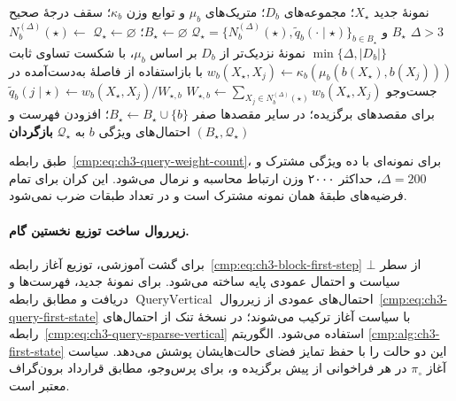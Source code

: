 \begin{algorithm}[!htbp]
\caption{زیرروال $\operatorname{QueryVertical}$: انتقال عمودی نمونهٔ جدید}
\label{cmp:alg:ch3-query-vertical}
\begin{algorithmic}[1]
\REQUIRE نمونهٔ جدید $X_\star$؛ مجموعه‌های $D_b$؛
متریک‌های $\mu_b$ و توابع وزن $\kappa_b$؛
سقف درجهٔ صحیح $\Delta>3$
\ENSURE $B_\star$ و
$\mathcal Q_\star=\{N_b^{(\Delta)}(\star),
\widetilde q_b(\cdot\mid\star)\}_{b\in B_\star}$
\STATE $B_\star\gets\varnothing$؛
$\mathcal Q_\star\gets\varnothing$
    \STATE $N_b^{(\Delta)}(\star)\gets$
    $\min\{\Delta,|D_b|\}$ نمونهٔ نزدیک‌تر
    از $D_b$ بر اساس $\mu_b$، با شکست تساوی ثابت
        \STATE $w_b(X_\star,X_j)\gets
        \kappa_b(\mu_b(b(X_\star),b(X_j)))$
        با بازاستفاده از فاصلهٔ به‌دست‌آمده در جست‌وجو
    \ENDFOR
    \STATE $W_{\star,b}\gets
    \sum_{X_j\in N_b^{(\Delta)}(\star)}w_b(X_\star,X_j)$
        \STATE $\widetilde q_b(j\mid\star)\gets
        w_b(X_\star,X_j)/W_{\star,b}$
        برای مقصدهای برگزیده؛ در سایر مقصدها صفر
        \STATE $B_\star\gets B_\star\cup\{b\}$؛
        افزودن فهرست و احتمال‌های ویژگی $b$ به $\mathcal Q_\star$
    \ENDIF
\ENDFOR
\STATE \textbf{بازگردان} $(B_\star,\mathcal Q_\star)$
\end{algorithmic}
\end{algorithm}

طبق رابطه~\eqref{cmp:eq:ch3-query-weight-count}،
برای نمونه‌ای با ده ویژگی مشترک و $\Delta=200$،
حداکثر ۲۰۰۰ وزن ارتباط محاسبه و نرمال می‌شود.
این کران برای تمام فرضیه‌های طبقهٔ همان نمونه
مشترک است و در تعداد طبقات ضرب نمی‌شود.

\paragraph{زیرروال ساخت توزیع نخستین گام.}
برای گشت آموزشی، توزیع آغاز
رابطه~\eqref{cmp:eq:ch3-block-first-step}
از سطر $\bot$ سیاست و احتمال
عمودی پایه ساخته می‌شود. برای
نمونهٔ جدید، فهرست‌ها و احتمال‌های عمودی
از زیرروال $\operatorname{QueryVertical}$
دریافت و مطابق
رابطه~\eqref{cmp:eq:ch3-query-first-state}
با سیاست آغاز ترکیب می‌شوند؛ در نسخهٔ تنک
از احتمال‌های رابطه~\eqref{cmp:eq:ch3-query-sparse-vertical}
استفاده می‌شود. الگوریتم
\ref{cmp:alg:ch3-first-state}
این دو حالت را با حفظ تمایز
فضای حالت‌هایشان پوشش می‌دهد.
سیاست آغاز $\pi_\circ$ در هر
فراخوانی از پیش برگزیده و،
برای پرس‌وجو، مطابق قرارداد
برون‌گراف معتبر است.


